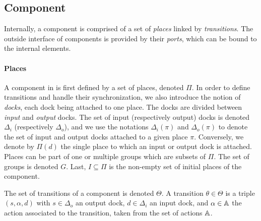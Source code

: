 \subsection{Component}

Internally, a \mad component is comprised of a set of \emph{places}
linked by \emph{transitions}. The outside interface of components is
provided by their \emph{ports}, which can be bound to the internal
elements.

\paragraph{Places}{

A component in \mad is first defined by a set of places, denoted
$\Pi$. In order to define transitions and handle their
synchronization, we also introduce the notion of \emph{docks}, each
dock being attached to one place. The docks are divided between
\emph{input} and \emph{output} docks. The set of input (respectively
output) docks is denoted $\Delta_i$ (respectively $\Delta_o$), and we
use the notations $\Delta_i (\pi)$ and $\Delta_o (\pi)$ to denote the
set of input and output docks attached to a given place
$\pi$. Conversely, we denote by $\Pi(d)$ the single place to which an
input or output dock is attached. Places can be part of one or
multiple groups which are subsets of $\Pi$. The set of groups is
denoted $G$. Last, $I \subseteq \Pi$ is the non-empty set of initial
places of the component.

The set of transitions of a component is denoted
$\Theta$. A transition $\theta \in \Theta$ is a triple
$\left(s, \alpha, d\right)$ with $s\in\Delta_{o}$ an output dock,
$d\in\Delta_{i}$ an input dock, and $\alpha \in \mathbb{A}$ the action
associated to the transition, taken from the set of actions $\mathbb{A}$.
}

